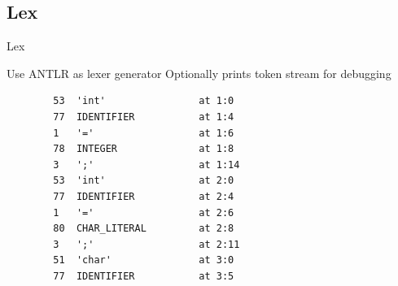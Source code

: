 \documentclass[aspectratio=1610]{ctexbeamer}
\begin{document}
\subsection{Lex}
\begin{frame}[fragile]{Lex}
    \begin{outline}
        \1 Use ANTLR as lexer generator
        \1 Optionally prints token stream for debugging
    \end{outline}
    \begin{verbatim}
        53  'int'                at 1:0
        77  IDENTIFIER           at 1:4
        1   '='                  at 1:6
        78  INTEGER              at 1:8
        3   ';'                  at 1:14
        53  'int'                at 2:0
        77  IDENTIFIER           at 2:4
        1   '='                  at 2:6
        80  CHAR_LITERAL         at 2:8
        3   ';'                  at 2:11
        51  'char'               at 3:0
        77  IDENTIFIER           at 3:5
    \end{verbatim}
\end{frame}
\end{document}
